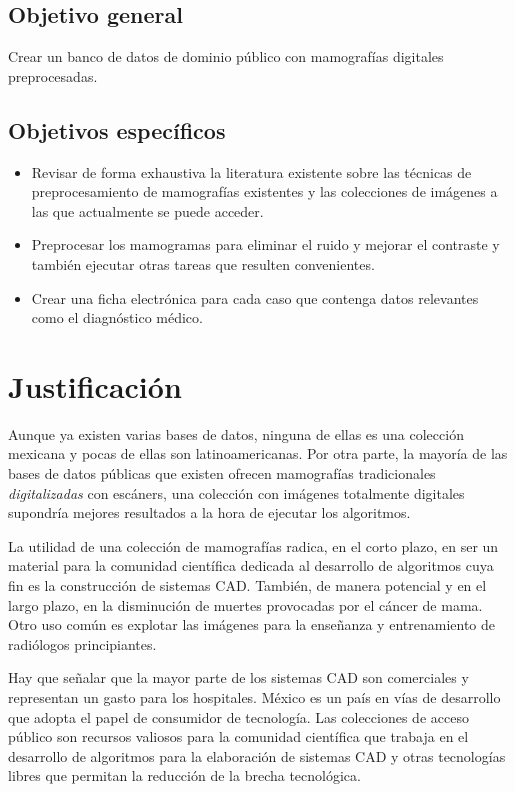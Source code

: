 \subsection{Objetivo general}

Crear un banco de datos de dominio público con mamografías digitales
preprocesadas.

\subsection{Objetivos específicos}

\begin{itemize}

    \item Revisar de forma exhaustiva la literatura existente sobre las
        técnicas de preprocesamiento de mamografías existentes y las colecciones
        de imágenes a las que actualmente se puede acceder.
    \item Preprocesar los mamogramas para eliminar el ruido y mejorar el
    contraste y también ejecutar otras tareas que resulten convenientes.
    \item Crear una ficha electrónica para cada caso que contenga datos
    relevantes como el diagnóstico médico.
\end{itemize}

\section{Justificación}

Aunque ya existen varias bases de datos, ninguna de ellas es una colección
mexicana y pocas de ellas son latinoamericanas. Por otra parte, la mayoría de
las bases de datos públicas que existen ofrecen mamografías tradicionales
\textit{digitalizadas} con escáners, una colección con imágenes totalmente
digitales supondría mejores resultados a la hora de ejecutar los algoritmos.

La utilidad de una colección de mamografías radica, en el corto plazo, en ser
un material para la comunidad científica dedicada al desarrollo de algoritmos
cuya fin es la construcción de sistemas CAD. También, de manera potencial y en
el largo plazo, en la disminución de muertes provocadas por el cáncer de mama.
Otro uso común es explotar las imágenes para la enseñanza y entrenamiento
de radiólogos principiantes.

Hay que señalar que la mayor parte de los sistemas CAD son comerciales y
representan un gasto para los hospitales. México es un país en vías de
desarrollo que adopta el papel de consumidor de tecnología. Las colecciones de
acceso público son recursos valiosos para la comunidad científica que trabaja en el
desarrollo de algoritmos para la elaboración de sistemas CAD y otras
tecnologías libres que permitan la reducción de la brecha tecnológica.

